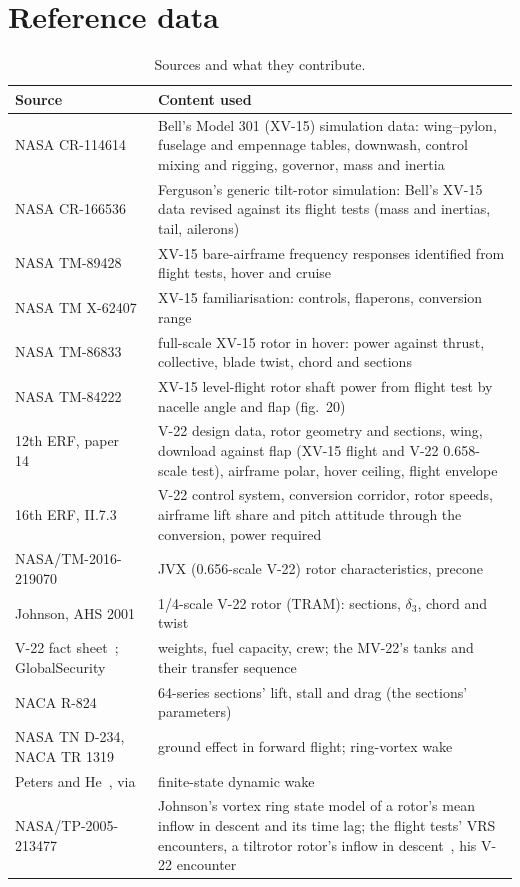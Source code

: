 \documentclass[10pt,a4paper,twocolumn]{article}
\begin{document}
\section{Reference data}\label{sec:ref}
\begin{table}[t]
\centering\small
\caption{Sources and what they contribute.}\label{tab:sources}
\begin{tabularx}{\columnwidth}{@{}>{\raggedright\arraybackslash}p{2.55cm}X@{}}
\toprule
Source & Content used \\
\midrule
NASA CR-114614~\cite{cr} & Bell's Model 301 (XV-15) simulation data: wing--pylon, fuselage and empennage tables, downwash, control mixing and rigging, governor, mass and inertia \\
NASA CR-166536~\cite{gt} & Ferguson's generic tilt-rotor simulation: Bell's XV-15 data revised against its flight tests (mass and inertias, tail, ailerons) \\
NASA TM-89428~\cite{tt} & XV-15 bare-airframe frequency responses identified from flight tests, hover and cruise \\
NASA TM X-62407~\cite{tx} & XV-15 familiarisation: controls, flaperons, conversion range \\
NASA TM-86833~\cite{fb} & full-scale XV-15 rotor in hover: power against thrust, collective, blade twist, chord and sections \\
NASA TM-84222~\cite{cd} & XV-15 level-flight rotor shaft power from flight test by nacelle angle and flap (fig.~20) \\
12th ERF, paper 14~\cite{rc} & V-22 design data, rotor geometry and sections, wing, download against flap (XV-15 flight and V-22 0.658-scale test), airframe polar, hover ceiling, flight envelope \\
16th ERF, II.7.3~\cite{pd} & V-22 control system, conversion corridor, rotor speeds, airframe lift share and pitch attitude through the conversion, power required \\
NASA/TM-2016-219070~\cite{ac} & JVX (0.656-scale V-22) rotor characteristics, precone \\
Johnson, AHS 2001~\cite{wj} & 1/4-scale V-22 rotor (TRAM): sections, $\delta_3$, chord and twist \\
V-22 fact sheet~\cite{fs}; GlobalSecurity~\cite{gs} & weights, fuel capacity, crew; the MV-22's tanks and their transfer sequence \\
NACA R-824~\cite{nacar} & 64-series sections' lift, stall and drag (the sections' parameters) \\
NASA TN D-234, NACA TR 1319~\cite{heyson,hk} & ground effect in forward flight; ring-vortex wake \\
Peters and He~\cite{ph}, via~\cite{metu} & finite-state dynamic wake \\
NASA/TP-2005-213477~\cite{vrs} & Johnson's vortex ring state model of a rotor's mean inflow in descent and its time lag; the flight tests' VRS encounters, a tiltrotor rotor's inflow in descent~\cite{betzina}, his V-22 encounter \\
\bottomrule
\end{tabularx}
\end{table}
\end{document}
